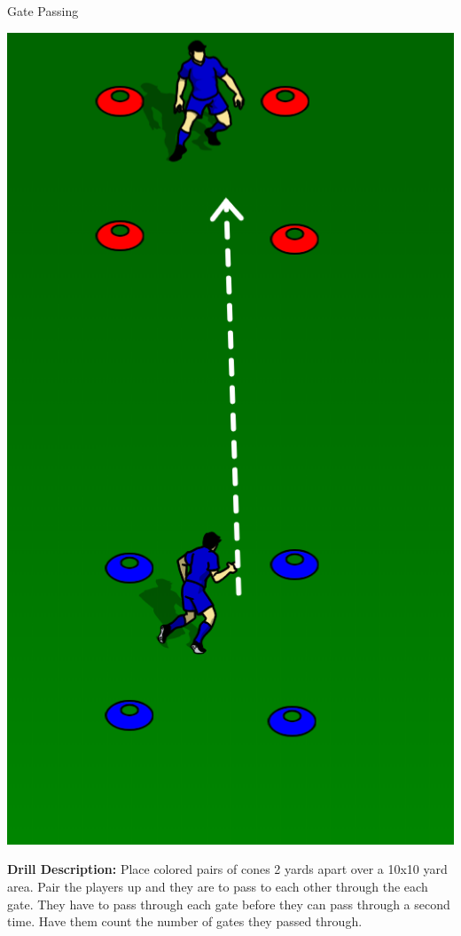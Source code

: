 \begin{oddBlock}{Gate Passing}

\begin{minipage}[t]{\linewidth}
    \centering
    
    \begin{minipage}{.3\linewidth} %
            \centering
            \includegraphics[width=.6\textwidth]{../img/Trimmed/Box_Passing}
    \end{minipage}
    \hspace{0.05\linewidth}
    \begin{minipage}{.6\linewidth} %
        \textbf{Drill Description:}
        Place colored pairs of cones 2 yards apart over a 10x10 yard area.  Pair the players up and they are to pass to each other through the each gate.  They have to pass through each gate before they can pass through a second time.  Have them count the number of gates they passed through.
        

\end{minipage}
\end{minipage}
\end{oddBlock}
